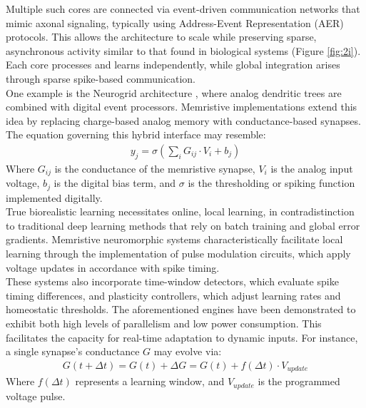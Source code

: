 \noindent Multiple such cores are connected via event-driven communication networks that mimic axonal signaling, typically using Address-Event Representation (AER) protocols. This allows the architecture to scale while preserving sparse, asynchronous activity similar to that found in biological systems (Figure \ref{fig:2i}). Each core processes and learns independently, while global integration arises through sparse spike-based communication.\\

\noindent One example is the Neurogrid architecture \cite{khodagholy2015neurogrid}, where analog dendritic trees are combined with digital event processors. Memristive implementations extend this idea by replacing charge-based analog memory with conductance-based synapses. The equation governing this hybrid interface may resemble:
\begin{align}
    y_j = \sigma \left( \sum_i G_{ij} \cdot V_i + b_j  \right) \label{eq:2.40}
\end{align}
\noindent Where $G_{ij}$ is the conductance of the memristive synapse, $V_i$ is the analog input voltage, $b_j$ is the digital bias term, and $\sigma$ is the thresholding or spiking function implemented digitally. \\

\noindent True biorealistic learning necessitates online, local learning, in contradistinction to traditional deep learning methods that rely on batch training and global error gradients. Memristive neuromorphic systems characteristically facilitate local learning through the implementation of pulse modulation circuits, which apply voltage updates in accordance with spike timing. \\

\noindent These systems also incorporate time-window detectors, which evaluate spike timing differences, and plasticity controllers, which adjust learning rates and homeostatic thresholds. The aforementioned engines have been demonstrated to exhibit both high levels of parallelism and low power consumption. This facilitates the capacity for real-time adaptation to dynamic inputs. For instance, a single synapse’s conductance $G$ may evolve via:
\begin{align}
    G(t + \Delta t) = G(t) + \Delta G = G(t) + f(\Delta t) \cdot V_{update} \label{eq:2.41}
\end{align}
\noindent Where $f(\Delta t)$ represents a learning window, and $V_{update}$ is the programmed voltage pulse.\\


